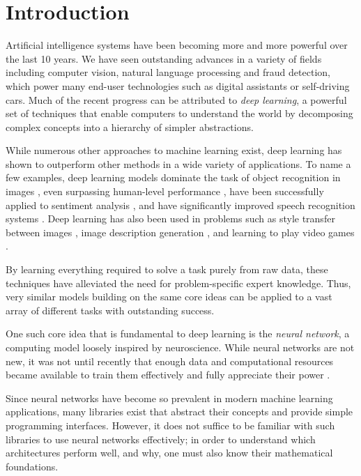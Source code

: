 \section{Introduction}
Artificial intelligence systems have been becoming more and more powerful over the last 10 years. We have seen outstanding advances in a variety of fields including computer vision, natural language processing and fraud detection, which power many end-user technologies such as digital assistants or self-driving cars. Much of the recent progress can be attributed to \emph{deep learning}, a powerful set of techniques that enable computers to understand the world by decomposing complex concepts into a hierarchy of simpler abstractions.

While numerous other approaches to machine learning exist, deep learning has shown to outperform other methods in a wide variety of applications. To name a few examples, deep learning models dominate the task of object recognition in images \cite{DBLP:journals/ijcv/RussakovskyDSKS15}, even surpassing human-level performance \cite{DBLP:conf/iccv/HeZRS15}, have been successfully applied to sentiment analysis \cite{DBLP:conf/sigir/SeverynM15a}, and
have significantly improved speech recognition systems \cite{DBLP:journals/taslp/MohamedDH12}. Deep learning has also been used in problems such as style transfer between images \cite{DBLP:conf/cvpr/GatysEB16}, image description generation \cite{DBLP:journals/pami/KarpathyF17}, and learning to play video games \cite{DBLP:journals/nature/MnihKSRVBGRFOPB15}.

By learning everything required to solve a task purely from raw data, these techniques have alleviated the need for problem-specific expert knowledge. Thus, very similar models building on the same core ideas can be applied to a vast array of different tasks with outstanding success.

One such core idea that is fundamental to deep learning is the \emph{neural network}, a computing model loosely inspired by neuroscience. While neural networks are not new, it was not until recently that enough data and computational resources became available to train them effectively and fully appreciate their power \cite[Ch.\,1,\,pp.\,18-21]{DBLP:books/daglib/0040158}.

Since neural networks have become so prevalent in modern machine learning applications, many libraries exist that abstract their concepts and provide simple programming interfaces. However, it does not suffice to be familiar with such libraries to use neural networks effectively; in order to understand which architectures perform well, and why, one must also know their mathematical foundations.

